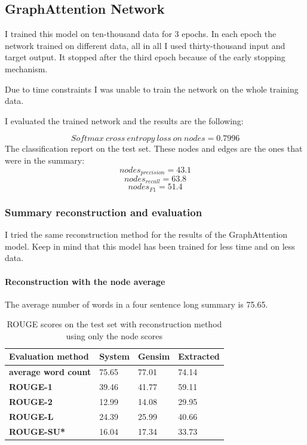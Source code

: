\subsection{GraphAttention Network}

I trained this model on ten-thousand data for 3 epochs. In each epoch the network trained on different data, all in all I used thirty-thousand input and target output. It stopped after the third epoch because of the early stopping mechanism.

Due to time constraints I was unable to train the network on the whole training data.

I evaluated the trained network and the results are the following:

\[Softmax\ cross\ entropy\ loss\ on\ nodes = 0.7996\]
The classification report on the test set. These nodes and edges are the ones that were in the summary:
\[nodes_{precision} = 43.1\]
\[nodes_{recall} = 63.8\]
\[nodes_{F1} = 51.4\]

\subsubsection{Summary reconstruction and evaluation}
I tried the same reconstruction method for the results of the GraphAttention model. Keep in mind that this model has been trained for less time and on less data.

\paragraph{Reconstruction with the node average}

The average number of words in a four sentence long summary is 75.65.

\begin{table}[!ht]
	\centering
	\begin{tabular}{| l | l | l | l |}
	\hline
	\textbf{Evaluation method}&\textbf{System}&\textbf{Gensim}&\textbf{Extracted}\\ \hline \hline
	\textbf{average word count}&75.65&77.01&74.14 \\ \hline
	\textbf{ROUGE-1}&39.46&41.77&59.11 \\ \hline
	\textbf{ROUGE-2}&12.99&14.08&29.95 \\ \hline
	\textbf{ROUGE-L}&24.39&25.99&40.66 \\ \hline
	\textbf{ROUGE-SU*}&16.04&17.34&33.73 \\ \hline
	\end{tabular}
	\caption{ROUGE scores on the test set with reconstruction method using only the node scores}
\end{table}

